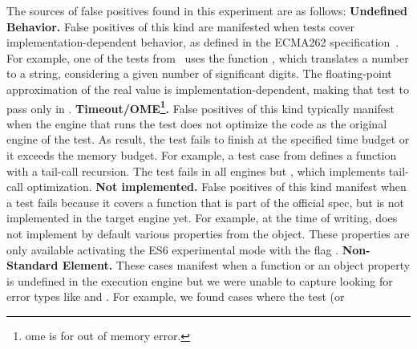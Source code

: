 \documentclass[10pt,conference,anonymous]{IEEEtran}
\begin{document}

The sources of false positives found in this experiment are as
follows: \textbf{Undefined Behavior.} False positives of this kind are
manifested when tests cover implementation-dependent behavior, as
defined in the ECMA262 specification~\cite{ecmas262-spec}. For
example, one of the tests from \jerry\ uses the function
, which translates a number to
a string, considering a given number of significant digits. The
floating-point approximation of the real value is
implementation-dependent, making that test to pass only in
\chakra. \textbf{Timeout/OME\footnote{ome is for out of memory
    error.}.} False positives of this kind typically manifest when the
engine that runs the test does not optimize the code as the original
engine of the test. As result, the test fails to finish at the
specified time budget or it exceeds the memory budget. For example, a
test case from \jsc{} defines a function with a tail-call
recursion. The test fails in all engines but \jsc{}, which implements
tail-call optimization. \textbf{Not implemented.} False positives of
this kind manifest when a test fails because it covers a function that
is part of the official spec, but is not implemented in the target
engine yet. For example, at the time of writing, \chakra{} does not
implement by default various properties from the 
object. These properties are only available activating the ES6
experimental mode with the flag .
\textbf{Non-Standard Element.} These cases manifest when a function or
an object property is undefined in the execution engine but we were
unable to capture looking for error types like 
and . For example, we found cases where the test (or
\end{document}
